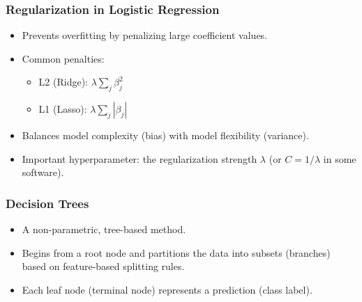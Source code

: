 \documentclass[aspectratio=169]{beamer}
\begin{document}
\begin{frame}
    \frametitle{Regularization in Logistic Regression}
    \begin{itemize}
        \item Prevents overfitting by penalizing large coefficient values.
        \item Common penalties:
        \begin{itemize}
            \item L2 (Ridge): \(\lambda \sum_j \beta_j^2\)
            \item L1 (Lasso): \(\lambda \sum_j |\beta_j|\)
        \end{itemize}
        \item Balances model complexity (bias) with model flexibility (variance).
        \item Important hyperparameter: the regularization strength \(\lambda\) (or \(C = 1/\lambda\) in some software).
    \end{itemize}
\end{frame}

\begin{frame}
    \frametitle{Decision Trees}
    \begin{itemize}
        \item A non-parametric, tree-based method.
        \item Begins from a root node and partitions the data into subsets (branches) based on feature-based splitting rules.
        \item Each leaf node (terminal node) represents a prediction (class label).
    \end{itemize}
\end{frame}
\end{document}
